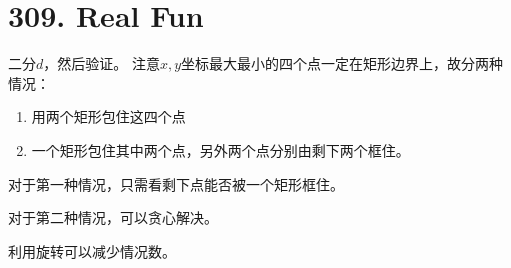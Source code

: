 \section{309. Real Fun}
二分$d$，然后验证。
注意$x,y$坐标最大最小的四个点一定在矩形边界上，故分两种情况：
\begin{enumerate}
\item 用两个矩形包住这四个点
\item 一个矩形包住其中两个点，另外两个点分别由剩下两个框住。
\end{enumerate}
\par 对于第一种情况，只需看剩下点能否被一个矩形框住。
\par 对于第二种情况，可以贪心解决。
\par 利用旋转可以减少情况数。
